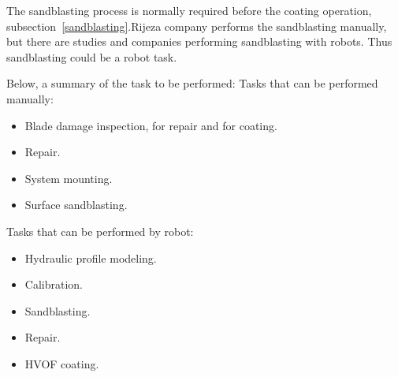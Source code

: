 The sandblasting process is normally required before the coating
operation, subsection~\ref{sandblasting}.Rijeza company performs the sandblasting manually, but there are studies and
companies performing sandblasting with robots. Thus sandblasting could be a
robot task.


Below, a summary of the task to be performed:
Tasks that can be performed manually:
\begin{itemize}
  \item Blade damage inspection, for repair and for coating.%
  \item Repair.
  \item System mounting.%
  \item Surface sandblasting.%
\end{itemize}

Tasks that can be performed by robot:%
\begin{itemize}
  \item Hydraulic profile modeling.%
  \item Calibration.
  \item Sandblasting.
  \item Repair.
  \item HVOF coating.
\end{itemize}
